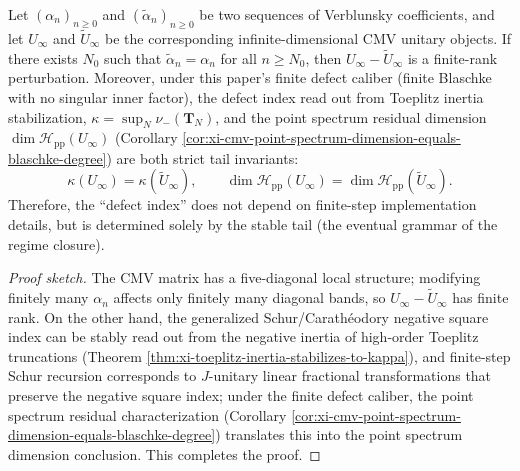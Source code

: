 \begin{proposition}\label{con:discussion-cmv-tail-invariant}
Let \((\alpha_n)_{n\ge 0}\) and \((\tilde\alpha_n)_{n\ge 0}\) be two sequences of Verblunsky coefficients, and let \(U_\infty\) and \(\tilde U_\infty\) be the corresponding infinite-dimensional CMV unitary objects.
If there exists \(N_0\) such that \(\tilde\alpha_n=\alpha_n\) for all \(n\ge N_0\), then \(U_\infty-\tilde U_\infty\) is a finite-rank perturbation.
Moreover, under this paper's finite defect caliber (finite Blaschke with no singular inner factor), the defect index read out from Toeplitz inertia stabilization,
\(
\kappa=\sup_{N}\nu_-(\mathbf{T}_N)
\),
and the point spectrum residual dimension \(\dim\mathcal H_{\mathrm{pp}}(U_\infty)\) (Corollary \ref{cor:xi-cmv-point-spectrum-dimension-equals-blaschke-degree}) are both strict tail invariants:
\[
\boxed{\;
\kappa(U_\infty)=\kappa(\tilde U_\infty),
\qquad
\dim\mathcal H_{\mathrm{pp}}(U_\infty)=\dim\mathcal H_{\mathrm{pp}}(\tilde U_\infty).\;}
\]
Therefore, the ``defect index'' does not depend on finite-step implementation details, but is determined solely by the stable tail (the eventual grammar of the regime closure).
\end{proposition}
\begin{proof}[Proof sketch]
The CMV matrix has a five-diagonal local structure; modifying finitely many \(\alpha_n\) affects only finitely many diagonal bands, so \(U_\infty-\tilde U_\infty\) has finite rank.
On the other hand, the generalized Schur/Carath\'eodory negative square index can be stably read out from the negative inertia of high-order Toeplitz truncations (Theorem \ref{thm:xi-toeplitz-inertia-stabilizes-to-kappa}), and finite-step Schur recursion corresponds to \(J\)-unitary linear fractional transformations that preserve the negative square index;
under the finite defect caliber, the point spectrum residual characterization (Corollary \ref{cor:xi-cmv-point-spectrum-dimension-equals-blaschke-degree}) translates this into the point spectrum dimension conclusion. This completes the proof.
\end{proof}


